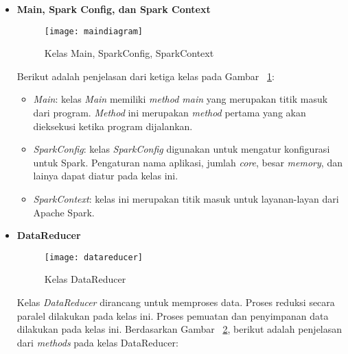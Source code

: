 \begin{itemize}

\item \textbf{Main, Spark Config, dan Spark Context}\\

\begin{figure}[H]
    \centering  
    \texttt{[image: maindiagram]}  
    \caption[Kelas Main, SparkConfig, SparkContext]{Kelas Main, SparkConfig, SparkContext} 
    \label{fig:maindiagram} 
\end{figure}

Berikut adalah penjelasan dari ketiga kelas pada Gambar ~\ref{fig:maindiagram}:

\begin{itemize}

\item \textit{Main}: kelas \textit{Main} memiliki \textit{method main}  yang merupakan titik masuk dari program. \textit{Method} ini merupakan \textit{method} pertama yang akan dieksekusi ketika program dijalankan.

\item \textit{SparkConfig}: kelas \textit{SparkConfig} digunakan untuk mengatur konfigurasi untuk Spark. Pengaturan nama aplikasi, jumlah \textit{core}, besar \textit{memory}, dan lainya dapat diatur pada kelas ini.

\item \textit{SparkContext}: kelas ini merupakan titik masuk untuk layanan-layan dari Apache Spark.\\

\end{itemize}


\item \textbf{DataReducer}\\

\begin{figure}[H]
    \centering  
    \texttt{[image: datareducer]}  
    \caption[Kelas DataReducer]{Kelas DataReducer} 
    \label{fig:datareducer} 
\end{figure}

Kelas \textit{DataReducer} dirancang untuk memproses data. Proses reduksi secara paralel dilakukan pada kelas ini. Proses pemuatan dan penyimpanan data dilakukan pada kelas ini. Berdasarkan Gambar ~\ref{fig:datareducer}, berikut adalah penjelasan dari \textit{methods} pada kelas DataReducer:

\begin{itemize}


\end{itemize}
\end{itemize}
